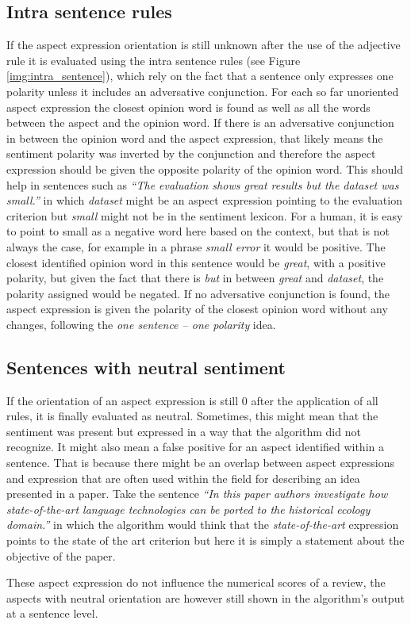 \subsection{Intra sentence rules}
If the aspect expression orientation is still unknown after the use of the adjective rule it is evaluated using the intra sentence rules (see Figure \ref{img:intra_sentence}), which rely on the fact that a sentence only expresses one polarity unless it includes an adversative conjunction.
For each so far unoriented aspect expression the closest opinion word is found as well as all the words between the aspect and the opinion word. If there is an adversative conjunction in between the opinion word and the aspect expression, that likely means the sentiment polarity was inverted by the conjunction and therefore the aspect expression should be given the opposite polarity of the opinion word. This should help in sentences such as \textit{``The evaluation shows great results but the dataset was small.''} in which \textit{dataset} might be an aspect expression pointing to the evaluation criterion but \textit{small} might not be in the sentiment lexicon. For a human, it is easy to point to small as a negative word here based on the context, but that is not always the case, for example in a phrase \textit{small error} it would be positive. The closest identified opinion word in this sentence would be \textit{great}, with a positive polarity, but given the fact that there is \textit{but} in between \textit{great} and \textit{dataset}, the polarity assigned would be negated.
If no adversative conjunction is found, the aspect expression is given the polarity of the closest opinion word without any changes, following the \textit{one sentence -- one polarity} idea. 


\subsection{Sentences with neutral sentiment}
If the orientation of an aspect expression is still 0 after the application of all rules, it is finally evaluated as neutral. Sometimes, this might mean that the sentiment was present but expressed in a way that the algorithm did not recognize. It might also mean a false positive for an aspect identified within a sentence. That is because there might be an overlap between aspect expressions and expression that are often used within the field for describing an idea presented in a paper. Take the sentence \textit{``In this paper authors investigate how state-of-the-art language technologies can be ported to the historical ecology domain.''} in which the algorithm would think that the \textit{state-of-the-art} expression points to the state of the art criterion but here it is simply a statement about the objective of the paper. 

These aspect expression do not influence the numerical scores of a review, the aspects with neutral orientation are however still shown in the algorithm's output at a sentence level.
